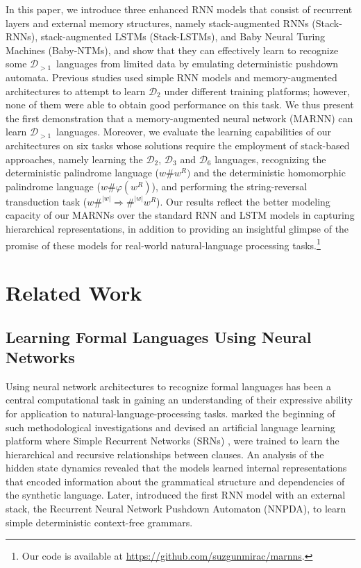 \documentclass[11pt,a4paper]{article}
\theoremstyle{plain}
\newcommand{\dyck}[1]{\ensuremath{\mathcal{D}_{#1}}}
\newcommand{\gendyck}{\dyck{>1}}
\begin{document}
In this paper, we introduce three enhanced RNN models that consist of recurrent layers and external memory structures, namely stack-augmented RNNs (Stack-RNNs), stack-augmented LSTMs (Stack-LSTMs), and Baby Neural Turing Machines (Baby-NTMs), and show that they can effectively learn to recognize some \gendyck\ languages from limited data by emulating deterministic pushdown automata. Previous studies used simple RNN models \citep{bernardy2018can,sennhauser2018evaluating,suzgun-etal-2019-lstm, yu-etal-2019-learning} and memory-augmented architectures \citep{hao2018context} to attempt to learn \dyck{2} under different training platforms; however, none of them were able to obtain good performance on this task. We thus present the first demonstration that a memory-augmented neural network (MARNN) can learn \gendyck\ languages.
Moreover, we evaluate the learning capabilities of our architectures on 
six tasks whose solutions require the employment of stack-based approaches, namely learning the \dyck{2}, \dyck{3} and \dyck{6} languages, recognizing the deterministic palindrome language ($w\#w^R)$ and the deterministic homomorphic palindrome language ($w\#\varphi(w^R)$), and performing the string-reversal transduction task ($w\#^{|w|} \Rightarrow \#^{|w|} w^R$). Our results reflect the better modeling capacity of our MARNNs over the standard RNN and LSTM models in capturing hierarchical representations, in addition to providing an insightful glimpse of the promise of these models for real-world natural-language processing tasks.\footnote{Our code is available at \url{https://github.com/suzgunmirac/marnns}.} 

\section{Related Work}
\vspace{-0.5em}
 \subsection{Learning Formal Languages Using Neural Networks}
Using neural network architectures to recognize formal languages has been a central computational task in gaining an understanding of their expressive ability for application to natural-language-processing tasks. \citet{elman1991distributed} marked the beginning of such methodological investigations and devised an artificial language learning platform where Simple Recurrent Networks (SRNs) \citep{elman1990finding}, were trained to learn the hierarchical and recursive relationships between clauses. An analysis of the hidden state dynamics revealed that the models learned internal representations that encoded information about the grammatical structure and dependencies of the synthetic language. Later, \citet{das1992learning} introduced the first RNN model with an external stack, the Recurrent Neural Network Pushdown Automaton (NNPDA), to learn simple deterministic context-free grammars.
\end{document}
